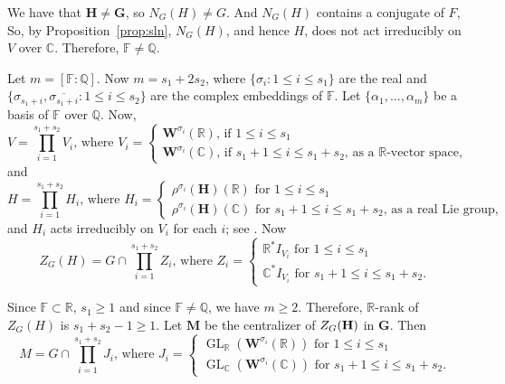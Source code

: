 \documentclass[12pt,reqno]{amsart}
\newcommand{\GL}{\operatorname{GL}}
\numberwithin{equation}{section}
\theoremstyle{plain}
\theoremstyle{definition}
\theoremstyle{remark}
\newcommand\bfG{\mathbf{G}}
\newcommand\bfH{\mathbf{H}}
\newcommand\bfM{\mathbf{M}}
\newcommand\bfW{\mathbf{W}}
\newcommand\bbF{\mathbb{F}}
\newcommand\bbQ{\mathbb{Q}}
\newcommand\bbR{\mathbb{R}}
\newcommand{\R}{\mathbb{R}}
\newcommand{\C}{\mathbb{C}}
\newcommand{\Q}{\mathbb{Q}}
\DeclareMathOperator{\Res}{Res}
\begin{document}
 We have that $\bfH\neq \bfG$, so $N_G(H)\neq G$. And $N_G(H)$ contains a conjugate of $F$, So, by Proposition~\ref{prop:sln}, $N_G(H)$, and hence $H$, does not act irreducibly on $V$ over $\C$. Therefore, $\bbF\neq \Q$. 
 
    Let $m=[\bbF:\Q]$. Now $m=s_1+2s_2$, where $\{\sigma_i:1\leq i\leq s_1\}$ are the real and 
    $\{\sigma_{s_1+i},\overline{\sigma_{s_1+i}}:1\leq i\leq s_2\}$ are the complex embeddings of $\mathbb{F}$. Let $\{\alpha_1,\ldots,\alpha_m\}$ be a basis of $\bbF$ over $\bbQ$. Now,
    \begin{equation} \label{eq:V-Vi}
    V=\prod_{i=1}^{s_1+s_2} V_i \text{, where } 
    V_i=\begin{cases}
        \bfW^{\sigma_i}({\bbR}) \text{, if } 1\leq i\leq s_1\\
        \bfW^{\sigma_i}(\C)
        \text{, if } s_1+1\leq i\leq s_1+s_2 \text{, as a $\R$-vector space,}
    \end{cases}
    \end{equation}
    and 
    \begin{equation} \label{eq:H-Hi}
    H=\prod_{i=1}^{s_1+s_2}{H_i} \text{, where } 
    H_i=\begin{cases}
        \rho^{\sigma_i}(\bfH)(\bbR) \text{ for } 1\leq i\leq s_1\\
        \rho^{\sigma_i}(\bfH)(\C)\text{ for } s_1+1\leq i\leq s_1+s_2 \text{, as a real Lie group,}
    \end{cases}
    \end{equation}
    and $H_i$ acts irreducibly on $V_i$ for each $i$; see \cite[p.~424, (2.2)]{EinsiedlerShi19}. 
    Now
    \begin{equation} \label{eq:Z-Zi}
    Z_G(H)=G\cap \prod_{i=1}^{s_1+s_2} Z_i \text{, where } 
    Z_i=\begin{cases}
        \R^\ast I_{V_i} \text{ for } 1\leq i\leq s_1 \\
        \C^\ast I_{V_i} \text{ for } s_1+1 \leq i\leq s_1+s_2.
    \end{cases}
    \end{equation}
    
    Since $\bbF\subset \R$, $s_1\geq 1$ and since $\bbF\neq\bbQ$, we have $m\geq 2$. Therefore, $\R$-rank of $Z_G(H)$ is $s_1+s_2-1\geq 1$. 
    Let $\bfM$ be the centralizer of $Z_G(\bf H)$ in $\bfG$. Then
    \begin{equation} \label{eq:M-prod}
       M=G\cap\prod_{i=1}^{s_1+s_2}J_i \text{, where } 
    J_i=\begin{cases}
        \GL_\R(\bfW^{\sigma_i}({\bbR})) \text{ for } 1\leq i\leq s_1\\
        \GL_\C(\bfW^{\sigma_i}(\C))\text{ for } s_1+1\leq i\leq s_1+s_2.
    \end{cases} 
    \end{equation}
    
\end{document}
